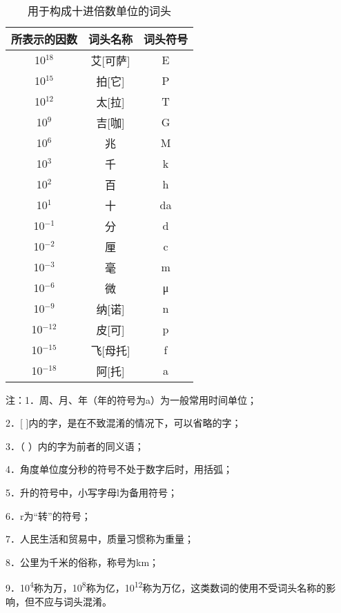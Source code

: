 \hspace*{\fill} \\


\begin{table}[htbp]
  \centering
  \caption{用于构成十进倍数单位的词头}
  \begin{tabular}{ccc}
    \toprule
    所表示的因数 & 词头名称 & 词头符号 \\
    \midrule
    10$^{18}$    & 艾[可萨] & E        \\
    10$^{15}$    & 拍[它]   & P        \\
    10$^{12}$    & 太[拉]   & T        \\
    10$^{9}$     & 吉[咖]   & G        \\
    10$^{6}$     & 兆       & M        \\
    10$^{3}$     & 千       & k        \\
    10$^{2}$     & 百       & h        \\
    10$^{1}$     & 十       & da       \\
    10$^{-1}$    & 分       & d        \\
    10$^{-2}$    & 厘       & c        \\
    10$^{-3}$    & 毫       & m        \\
    10$^{-6}$    & 微       & μ        \\
    10$^{-9}$    & 纳[诺]   & n        \\
    10$^{-12}$   & 皮[可]   & p        \\
    10$^{-15}$   & 飞[母托] & f        \\
    10$^{-18}$   & 阿[托]   & a        \\
    \bottomrule
  \end{tabular}%
  \label{tab:addlabel}%
\end{table}%

\parbox[t]{\textwidth}{
注：1．周、月、年（年的符号为a）为一般常用时间单位；

\hspace{2em}2．{[} {]}内的字，是在不致混淆的情况下，可以省略的字；

\hspace{2em}3．（ ）内的字为前者的同义语；

\hspace{2em}4．角度单位度分秒的符号不处于数字后时，用括弧；

\hspace{2em}5．升的符号中，小写字母l为备用符号；

\hspace{2em}6．r为``转''的符号；

\hspace{2em}7．人民生活和贸易中，质量习惯称为重量；

\hspace{2em}8．公里为千米的俗称，称号为km；

\hspace{2em}9．10\textsuperscript{4}称为万，10\textsuperscript{8}称为亿，10\textsuperscript{12}称为万亿，这类数词的使用不受词头名称的影响，但不应与词头混淆。
}

